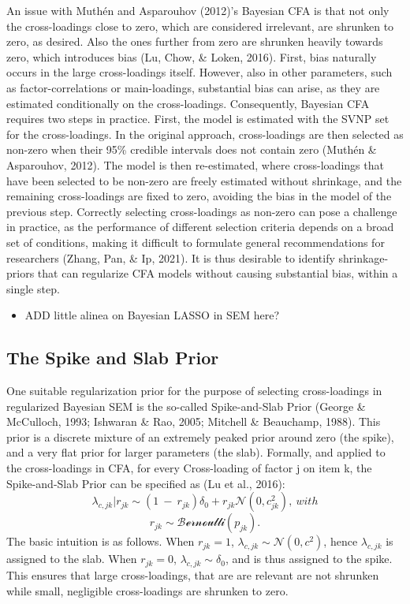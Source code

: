\documentclass[
  man, donotrepeattitle,floatsintext]{apa6}
\providecommand{\tightlist}{%
  \setlength{\itemsep}{0pt}\setlength{\parskip}{0pt}}
\begin{document}
An issue with Muthén and Asparouhov (2012)'s Bayesian CFA is that not only the cross-loadings close to zero, which are considered irrelevant, are shrunken to zero, as desired. Also the ones further from zero are shrunken heavily towards zero, which introduces bias (Lu, Chow, \& Loken, 2016). First, bias naturally occurs in the large cross-loadings itself. However, also in other parameters, such as factor-correlations or main-loadings, substantial bias can arise, as they are estimated conditionally on the cross-loadings. Consequently, Bayesian CFA requires two steps in practice. First, the model is estimated with the SVNP set for the cross-loadings. In the original approach, cross-loadings are then selected as non-zero when their 95\% credible intervals does not contain zero (Muthén \& Asparouhov, 2012). The model is then re-estimated, where cross-loadings that have been selected to be non-zero are freely estimated without shrinkage, and the remaining cross-loadings are fixed to zero, avoiding the bias in the model of the previous step. Correctly selecting cross-loadings as non-zero can pose a challenge in practice, as the performance of different selection criteria depends on a broad set of conditions, making it difficult to formulate general recommendations for researchers (Zhang, Pan, \& Ip, 2021). It is thus desirable to identify shrinkage-priors that can regularize CFA models without causing substantial bias, within a single step.

\begin{itemize}
\tightlist
\item
  ADD little alinea on Bayesian LASSO in SEM here?
\end{itemize}

\hypertarget{the-spike-and-slab-prior}{%
\subsection{The Spike and Slab Prior}\label{the-spike-and-slab-prior}}

One suitable regularization prior for the purpose of selecting cross-loadings in
regularized Bayesian SEM is the so-called Spike-and-Slab Prior (George \& McCulloch, 1993; Ishwaran \& Rao, 2005; Mitchell \& Beauchamp, 1988). This prior is a discrete mixture of an extremely peaked prior around zero (the spike), and a very flat prior for larger parameters (the slab). Formally, and applied to the cross-loadings in CFA, for every Cross-loading of factor j
on item k, the Spike-and-Slab Prior can be specified as (Lu et al., 2016):
\[\lambda_{c,jk} |r_{jk} \sim (1 \ - \ r_{jk})\delta_0 + r_{jk} \mathcal{N}(0, c^2_{jk}) , \ with\]
\[r_{jk} \sim \mathcal{Bernoulli}(p_{jk}).\]
The basic intuition is as follows. When \(r_{jk} = 1\), \(\lambda_{c,jk} \sim \mathcal{N}(0, c^2)\), hence \(\lambda_{c,jk}\) is assigned to the slab. When \(r_{jk} = 0\), \(\lambda_{c,jk} \sim \delta_0\), and is thus assigned to the spike. This ensures that large cross-loadings, that are are relevant are not shrunken while small, negligible cross-loadings are shrunken to zero.
\end{document}
